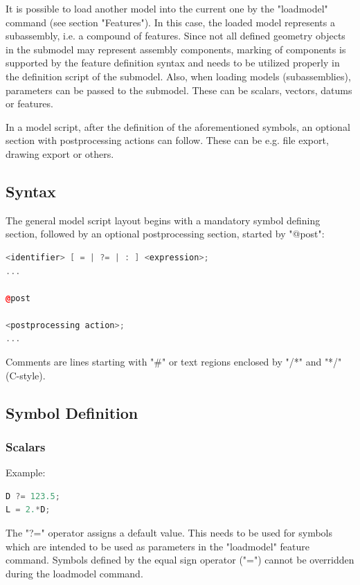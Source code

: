 It is possible to load another model into the current one by the "loadmodel" command (see section "Features"). 
In this case, the loaded model represents a subassembly, i.e. a compound of features.
Since not all defined geometry objects in the submodel may represent assembly components, marking of components is supported by the feature definition syntax and needs to be utilized properly in the definition script of the submodel. 
Also, when loading models (subassemblies), parameters can be passed to the submodel. 
These can be scalars, vectors, datums or features.

In a model script, after the definition of the aforementioned symbols,
an optional section with postprocessing actions can follow. 
These can be e.g. file export, drawing export or others.

\subsection{Syntax}

The general model script layout begins with a mandatory symbol defining
section, followed by an optional postprocessing section, started by
"@post":

\begin{lstlisting}[language=c++]
<identifier> [ = | ?= | : ] <expression>;
...

@post

<postprocessing action>;
...
\end{lstlisting}

Comments are lines starting with "\#" or text regions enclosed by "/*"
and "*/" (C-style).

\subsection{Symbol Definition}

\subsubsection{Scalars}

Example:

\begin{lstlisting}[language=c++]
D ?= 123.5;
L = 2.*D;
\end{lstlisting}

The "?=" operator assigns a default value. This needs to be used for
symbols which are intended to be used as parameters in the "loadmodel"
feature command. Symbols defined by the equal sign operator ("=") cannot
be overridden during the loadmodel command.

